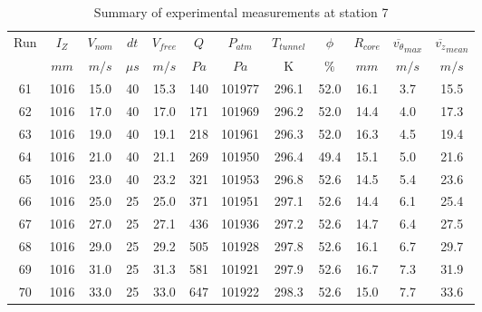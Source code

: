 \begin{table}[H]
\begin{center}
\begin{tabular}{|cccccccccccc|}
	\hline
	Run & $I_Z$ & $V_{nom}$ & $dt$ & $V_{free}$ & $Q$ & $P_{atm}$ & $T_{tunnel}$ & $\phi$ & $R_{core}$ & $\overline{v_{\theta}}_{max}$ & $\overline{v_{z}}_{mean}$\\
	  & $mm$ & $m/s$ & $\mu s$ & $m/s$ & $Pa$ & $Pa$ & K & $\%$ & $mm$ & $m/s$ & $m/s$\\
	\hline
	61 & 1016 & 15.0 & 40 & 15.3 & 140 & 101977 & 296.1 & 52.0 & 16.1 & 3.7 & 15.5\\
	62 & 1016 & 17.0 & 40 & 17.0 & 171 & 101969 & 296.2 & 52.0 & 14.4 & 4.0 & 17.3\\
	63 & 1016 & 19.0 & 40 & 19.1 & 218 & 101961 & 296.3 & 52.0 & 16.3 & 4.5 & 19.4\\
	64 & 1016 & 21.0 & 40 & 21.1 & 269 & 101950 & 296.4 & 49.4 & 15.1 & 5.0 & 21.6\\
	65 & 1016 & 23.0 & 40 & 23.2 & 321 & 101953 & 296.8 & 52.6 & 14.5 & 5.4 & 23.6\\
	66 & 1016 & 25.0 & 25 & 25.0 & 371 & 101951 & 297.1 & 52.6 & 14.4 & 6.1 & 25.4\\
	67 & 1016 & 27.0 & 25 & 27.1 & 436 & 101936 & 297.2 & 52.6 & 14.7 & 6.4 & 27.5\\
	68 & 1016 & 29.0 & 25 & 29.2 & 505 & 101928 & 297.8 & 52.6 & 16.1 & 6.7 & 29.7\\
	69 & 1016 & 31.0 & 25 & 31.3 & 581 & 101921 & 297.9 & 52.6 & 16.7 & 7.3 & 31.9\\
	70 & 1016 & 33.0 & 25 & 33.0 & 647 & 101922 & 298.3 & 52.6 & 15.0 & 7.7 & 33.6\\
	\hline
\end{tabular}
\caption{Summary of experimental measurements at station 7}
\label{table:experiment_results_7}
\end{center}
\end{table}
